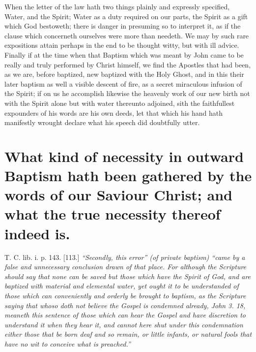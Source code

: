 When the letter of the law hath two things plainly and expressly specified, Water, and the Spirit; Water as a duty  required on our parts, the Spirit as a gift which God bestoweth; there is danger in presuming so to interpret it, as if the clause which concerneth ourselves were more than needeth. We may by such rare expositions attain perhaps in the end to be thought witty, but with ill advice.
Finally if at the time when that Baptism which was meant by John came to be really and truly performed by Christ himself, we find the Apostles that had been, as we are, before baptized, new baptized with the Holy Ghost, and in this their later baptism as well a visible descent of fire, as a secret miraculous infusion of the Spirit; if on us he accomplish likewise the heavenly work of our new birth not with the Spirit alone but with water thereunto adjoined, sith the faithfullest expounders of his words are his own deeds, let that which his hand hath manifestly wrought declare what his speech did doubtfully utter.

\section*{What kind of necessity in outward Baptism hath been gathered by the words of our Saviour Christ; and what the true necessity thereof indeed is.}

\begin{displayquote}
T. C. lib. i. p. 143. [113.] 
\itshape “Secondly, this error” (of private baptism) “came by a false and unnecessary conclusion drawn of that place. For although the Scripture should say that none can be saved but those which have the Spirit of God, and are baptized with material and elemental water, yet ought it to be understanded of those which can conveniently and orderly be brought to baptism, as the Scripture saying that whoso doth not believe the Gospel is condemned already, John 3. 18, meaneth this sentence of those which can hear the Gospel and have discretion to understand it when they hear it, and cannot here shut under this condemnation either those that be born deaf and so remain, or little infants, or natural fools that have no wit to conceive what is preached.”
\end{displayquote}

